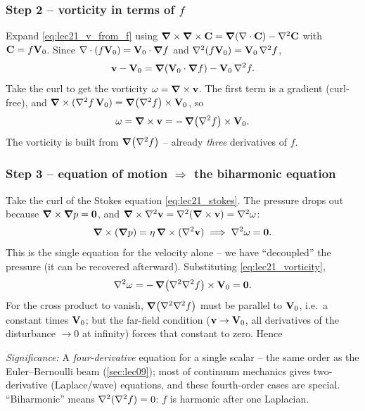 \documentclass[../main.tex]{subfiles}
\begin{document}
\subsubsection*{Step 2 -- vorticity in terms of $f$}
Expand \eqref{eq:lec21_v_from_f} using $\grad\times\grad\times\mathbf{C}=\grad(\nabla \cdot\mathbf{C})-\nabla^2\mathbf{C}$ with $\mathbf{C}=f\mathbf{V}_0$. Since $\nabla \cdot(f\mathbf{V}_0)=\mathbf{V}_0\cdot\grad f$ and $\nabla^2(f\mathbf{V}_0)=\mathbf{V}_0\,\nabla^2 f$,
\begin{equation}
  \mathbf{v}-\mathbf{V}_0=\grad(\mathbf{V}_0\cdot\grad f)-\mathbf{V}_0\,\nabla^2 f .
  \label{eq:lec21_v_expand}
\end{equation}
Take the curl to get the vorticity $\mathbf{\omega}=\grad\times\mathbf{v}$. The first term is a gradient (curl-free), and $\grad\times(\nabla^2 f\,\mathbf{V}_0)=\grad(\nabla^2 f)\times\mathbf{V}_0$, so
\begin{equation}
  \mathbf{\omega}=\grad\times\mathbf{v}=-\,\grad(\nabla^2 f)\times\mathbf{V}_0 .
  \label{eq:lec21_vorticity}
\end{equation}
The vorticity is built from $\grad(\nabla^2 f)$ -- already \emph{three} derivatives of $f$.

\subsubsection*{Step 3 -- equation of motion $\Rightarrow$ the biharmonic equation}
Take the curl of the Stokes equation \eqref{eq:lec21_stokes}. The pressure drops out because $\grad\times\grad p=\mathbf{0}$, and $\grad\times\nabla^2\mathbf{v}=\nabla^2(\grad\times\mathbf{v})=\nabla^2\mathbf{\omega}$:
\begin{equation}
  \grad\times(\grad p)=\eta\,\grad\times(\nabla^2\mathbf{v})
  \;\Longrightarrow\; \nabla^2\mathbf{\omega}=\mathbf{0} .
  \label{eq:lec21_curl_stokes}
\end{equation}
This is the single equation for the velocity alone -- we have ``decoupled'' the pressure (it can be recovered afterward). Substituting \eqref{eq:lec21_vorticity},
\begin{equation}
  \nabla^2\mathbf{\omega}=-\,\grad(\nabla^2\nabla^2 f)\times\mathbf{V}_0=\mathbf{0} .
  \label{eq:lec21_biharm_pre}
\end{equation}
For the cross product to vanish, $\grad(\nabla^2\nabla^2 f)$ must be parallel to $\mathbf{V}_0$, i.e.\ a constant times $\mathbf{V}_0$; but the far-field condition ($\mathbf{v}\to\mathbf{V}_0$, all derivatives of the disturbance $\to0$ at infinity) forces that constant to zero. Hence

\textit{Significance:} A \emph{four-derivative} equation for a single scalar -- the same order as the Euler--Bernoulli beam (\cref{sec:lec09}); most of continuum mechanics gives two-derivative (Laplace/wave) equations, and these fourth-order cases are special. ``Biharmonic'' means $\nabla^2(\nabla^2 f)=0$: $f$ is harmonic after one Laplacian.
\end{document}
